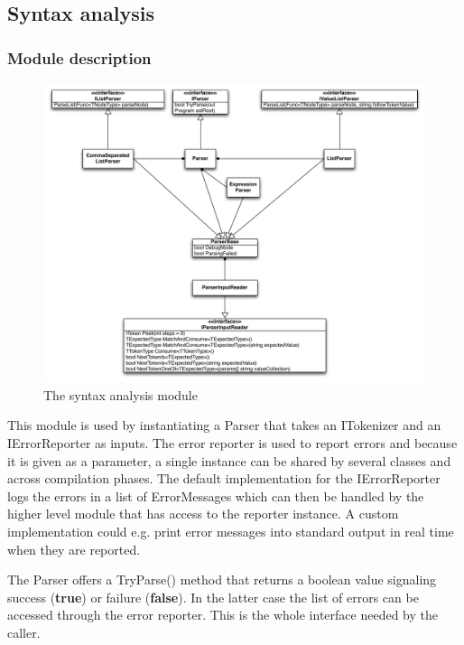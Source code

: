 \documentclass[a4paper,11pt]{article}
\begin{document}
\subsection{Syntax analysis}

\subsubsection{Module description}

\begin{figure}[h!]
\centering
\includegraphics[width=1.0\textwidth]{syntax_analysis.pdf}
\caption{The syntax analysis module}
\end{figure}

This module is used by instantiating a Parser that takes an ITokenizer and an IErrorReporter as inputs. The error reporter is used to report errors and because it is given as a parameter, a single instance can be shared by several classes and across compilation phases. The default implementation for the IErrorReporter logs the errors in a list of ErrorMessages which can then be handled by the higher level module that has access to the reporter instance. A custom implementation could e.g. print error messages into standard output in real time when they are reported.

The Parser offers a TryParse() method that returns a boolean value signaling success (\textbf{true}) or failure (\textbf{false}). In the latter case the list of errors can be accessed through the error reporter. This is the whole interface needed by the caller.
\end{document}
